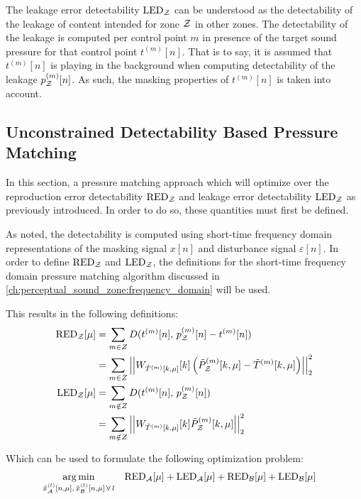 The leakage error detectability $\text{LED}_{\mathcal{Z}}$ can be understood as the detectability of the leakage of content intended for zone $\mathcal{Z}$
in other zones.
The detectability of the leakage is computed per control point $m$ in presence of the target sound pressure for that control point
$t^{(m)}[n]$.
That is to say, it is assumed that $t^{(m)}[n]$ is playing in the background when computing detectability of the 
leakage $p_{\mathcal{Z}}^{(m)}[n]$. 
As such, the masking properties of $t^{(m)}[n]$ is taken into account.

\subsection{Unconstrained Detectability Based Pressure Matching}
In this section, a pressure matching approach which will optimize over the reproduction error detectability $\text{RED}_{\mathcal{Z}}$ 
and leakage error detectability $\text{LED}_{\mathcal{Z}}$ as previously introduced.
In order to do so, these quantities must first be defined.

As noted, the detectability is computed using short-time frequency domain representations of the masking signal $x[n]$ and
disturbance signal $\varepsilon[n]$. 
In order to define $\text{RED}_{\mathcal{Z}}$ and $\text{LED}_{\mathcal{Z}}$, the definitions for the short-time frequency domain pressure matching algorithm 
discussed in \autoref{ch:perceptual_sound_zone:frequency_domain} will be used.

This results in the following definitions:
\begin{align}
    \text{RED}_\zz[\mu] &= \sum_{m\in Z} D(t^{(m)}[n],\,p_\zz^{(m)}[n] - t^{(m)}[n]) \\
                   &= \sum_{m\in Z} \norm[2][2]{W_{\tilde{T}^{(m)}[k,\mu]}[k]\left(\tilde{P}_\zz^{(m)}[k, \mu] - \tilde{T}^{(m)}[k, \mu]\right)}\\
    \text{LED}_\zz[\mu] &= \sum_{m\notin Z} D(t^{(m)}[n],\,p_\zz^{(m)}[n]) \\
                   &= \sum_{m\notin Z} \norm[2][2]{W_{\tilde{T}^{(m)}[k,\mu]}[k]\tilde{P}_\zz^{(m)}[k,\mu]}
\end{align}

Which can be used to formulate the following optimization problem:
\begin{align}
    \argmin{\tilde{x}_\za^{(l)}[n,\mu],\,\tilde{x}_\zb^{(l)}[n,\mu]\,\forall\,l}{
       &\text{RED}_\za[\mu] + \text{LED}_\za[\mu] + \text{RED}_\zb[\mu] + \text{LED}_\zb[\mu]
    }
\end{align}


